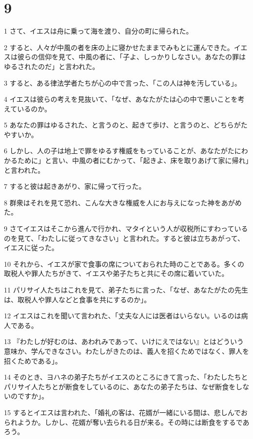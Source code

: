 \chapter{9}

\par 1 さて、イエスは舟に乗って海を渡り、自分の町に帰られた。
\par 2 すると、人々が中風の者を床の上に寝かせたままでみもとに運んできた。イエスは彼らの信仰を見て、中風の者に、「子よ、しっかりしなさい。あなたの罪はゆるされたのだ」と言われた。
\par 3 すると、ある律法学者たちが心の中で言った、「この人は神を汚している」。
\par 4 イエスは彼らの考えを見抜いて、「なぜ、あなたがたは心の中で悪いことを考えているのか。
\par 5 あなたの罪はゆるされた、と言うのと、起きて歩け、と言うのと、どちらがたやすいか。
\par 6 しかし、人の子は地上で罪をゆるす権威をもっていることが、あなたがたにわかるために」と言い、中風の者にむかって、「起きよ、床を取りあげて家に帰れ」と言われた。
\par 7 すると彼は起きあがり、家に帰って行った。
\par 8 群衆はそれを見て恐れ、こんな大きな権威を人にお与えになった神をあがめた。
\par 9 さてイエスはそこから進んで行かれ、マタイという人が収税所にすわっているのを見て、「わたしに従ってきなさい」と言われた。すると彼は立ちあがって、イエスに従った。
\par 10 それから、イエスが家で食事の席についておられた時のことである。多くの取税人や罪人たちがきて、イエスや弟子たちと共にその席に着いていた。
\par 11 パリサイ人たちはこれを見て、弟子たちに言った、「なぜ、あなたがたの先生は、取税人や罪人などと食事を共にするのか」。
\par 12 イエスはこれを聞いて言われた、「丈夫な人には医者はいらない。いるのは病人である。
\par 13 『わたしが好むのは、あわれみであって、いけにえではない』とはどういう意味か、学んできなさい。わたしがきたのは、義人を招くためではなく、罪人を招くためである」。
\par 14 そのとき、ヨハネの弟子たちがイエスのところにきて言った、「わたしたちとパリサイ人たちとが断食をしているのに、あなたの弟子たちは、なぜ断食をしないのですか」。
\par 15 するとイエスは言われた、「婚礼の客は、花婿が一緒にいる間は、悲しんでおられようか。しかし、花婿が奪い去られる日が来る。その時には断食をするであろう。
